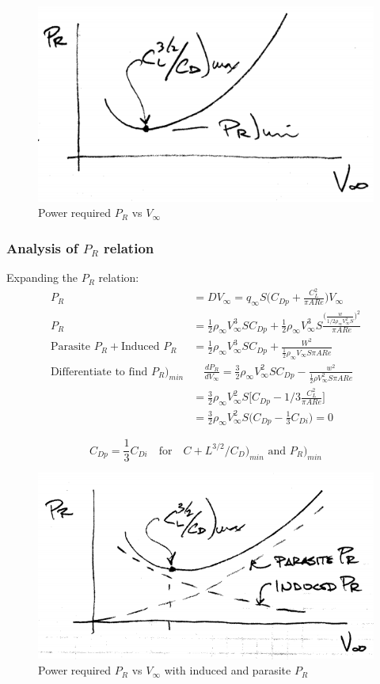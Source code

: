 \documentclass[draft=false, titlepage]{article}
\begin{document}
\begin{figure}[ht]
	\centering
	\includegraphics[width=0.5\linewidth]{Figures/p71_powerRequired.PNG}
	\caption{Power required $P_R$ vs $V_\infty$}
	\label{fig:p71_powerRequired}
\end{figure}
\subsubsection{Analysis of $P_R$ relation}
Expanding the $P_R$ relation:
\begin{align*}
P_R &=  DV_\infty = q_\infty S\big(C_{Dp} + \frac{C_L^2}{\pi AR e}\big) V_\infty\\P_R &= \frac{1}{2}\rho_\infty V_\infty^3 S C_{Dp} + \frac{1}{2}\rho_\infty V_\infty^3 S \frac{\Big(\frac{w}{1/2\rho_\infty V_\infty^2 S}\Big)^2}{\pi AR e}\\
\text{Parasite } P_R + \text{Induced } P_R &= \frac{1}{2}\rho_\infty V_\infty^3 S C_{Dp} + \frac{W^2}{\frac{1}{2}\rho_\infty V_\infty S \pi AR e}\\
\text{Differentiate to find } P_R\Big)_{min} &\quad \frac{dP_R}{dV_\infty} = \frac{3}{2}\rho_\infty V_\infty^2 S C_{Dp} - \frac{w^2}{\frac{1}{2}\rho V_\infty^2 S \pi AR e}\\
&= \frac{3}{2}\rho_\infty V_\infty^2S \Big[C_{Dp} - 1/3\frac{C_L^2}{\pi AR e}\Big]\\
&= \frac{3}{2}\rho_\infty V_\infty^2 S\Big(C_{Dp} - \frac{1}{3}C_{Di}\Big) = 0
\end{align*}

\begin{equation*}
\boxed{C_{Dp} = \frac{1}{3}C_{Di} \quad \text{for}\quad C+L^{3/2}/C_D\Big)_{min} \text{ and } P_R\Big)_{min}}
\end{equation*}
\begin{figure}[ht]
	\centering
	\includegraphics[width=0.5\linewidth]{Figures/p72_induced_parasite_PR.PNG}
	\caption{Power required $P_R$ vs $V_\infty$ with induced and parasite $P_R$}
	\label{fig:p72_induced_parasite_PR}
\end{figure}
\end{document}
